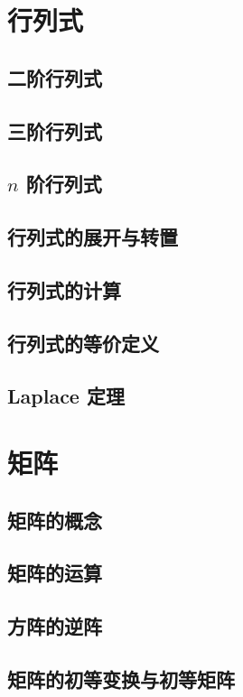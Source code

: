 \documentclass[a4paper, 11pt]{ctexbook}
\begin{document}
    \chapter{行列式}
        \section{二阶行列式}
            
        \section{三阶行列式}
            
        \section{\texorpdfstring{$n$}{n} 阶行列式}
            
        \section{行列式的展开与转置}
            
        \section{行列式的计算}
        \section{行列式的等价定义}
        \section{Laplace 定理}
    \chapter{矩阵}
        \section{矩阵的概念}
        \section{矩阵的运算}
            
        \section{方阵的逆阵}
            
        \section{矩阵的初等变换与初等矩阵}
\end{document}
